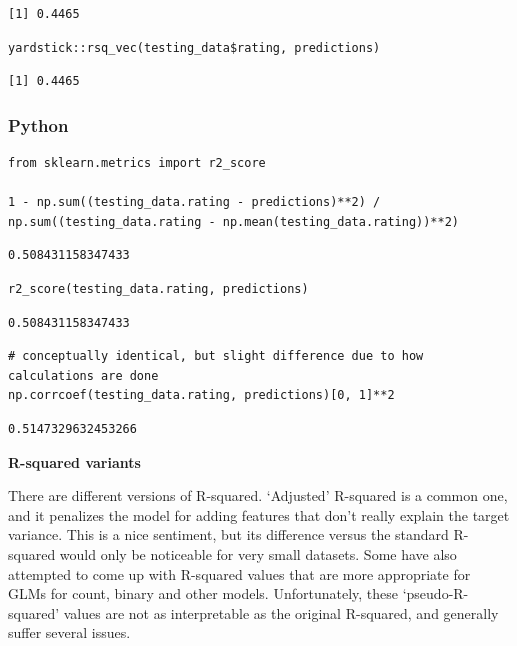 \documentclass[
  letterpaper,
]{krantz}
\begin{document}
\begin{verbatim}
[1] 0.4465
\end{verbatim}

\begin{verbatim}
yardstick::rsq_vec(testing_data$rating, predictions)
\end{verbatim}

\begin{verbatim}
[1] 0.4465
\end{verbatim}

\subsubsection{Python}

\begin{verbatim}
from sklearn.metrics import r2_score

1 - np.sum((testing_data.rating - predictions)**2) / np.sum((testing_data.rating - np.mean(testing_data.rating))**2)
\end{verbatim}

\begin{verbatim}
0.508431158347433
\end{verbatim}

\begin{verbatim}
r2_score(testing_data.rating, predictions)
\end{verbatim}

\begin{verbatim}
0.508431158347433
\end{verbatim}

\begin{verbatim}
# conceptually identical, but slight difference due to how calculations are done
np.corrcoef(testing_data.rating, predictions)[0, 1]**2
\end{verbatim}

\begin{verbatim}
0.5147329632453266
\end{verbatim}

\begin{tcolorbox}[enhanced jigsaw, colframe=quarto-callout-tip-color-frame, opacityback=0, breakable, left=2mm, rightrule=.15mm, toprule=.15mm, arc=.35mm, leftrule=.75mm, colback=white, bottomrule=.15mm]

\vspace{-3mm}\textbf{R-squared variants}\vspace{3mm}

There are different versions of R-squared. `Adjusted' R-squared is a
common one, and it penalizes the model for adding features that don't
really explain the target variance. This is a nice sentiment, but its
difference versus the standard R-squared would only be noticeable for
very small datasets. Some have also attempted to come up with R-squared
values that are more appropriate for GLMs for count, binary and other
models. Unfortunately, these `pseudo-R-squared' values are not as
interpretable as the original R-squared, and generally suffer several
issues.

\end{tcolorbox}
\end{document}
